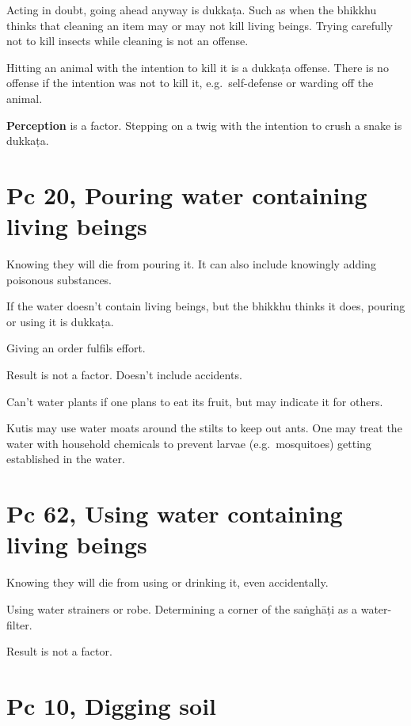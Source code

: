 Acting in doubt, going ahead anyway is dukkaṭa. Such as when the bhikkhu
thinks that cleaning an item may or may not kill living beings. Trying
carefully not to kill insects while cleaning is not an offense.

Hitting an animal with the intention to kill it is a dukkaṭa offense.
There is no offense if the intention was not to kill it,
e.g.~self-defense or warding off the animal.

\textbf{Perception} is a factor. Stepping on a twig with the intention
to crush a snake is dukkaṭa.

\clearpage

\section{Pc 20, Pouring water containing living beings}

Knowing they will die from pouring it. It can also include knowingly
adding poisonous substances.

If the water doesn't contain living beings, but the bhikkhu thinks it
does, pouring or using it is dukkaṭa.

Giving an order fulfils effort.

Result is not a factor. Doesn't include accidents.

Can't water plants if one plans to eat its fruit, but may indicate it
for others.

Kutis may use water moats around the stilts to keep out ants. One may
treat the water with household chemicals to prevent larvae
(e.g.~mosquitoes) getting established in the water.

\section{Pc 62, Using water containing living beings}

\enlargethispage{\baselineskip}

Knowing they will die from using or drinking it, even accidentally.

Using water strainers or robe. Determining a corner of the saṅghāṭi as a
water-filter.

Result is not a factor.

\section{Pc 10, Digging soil}

